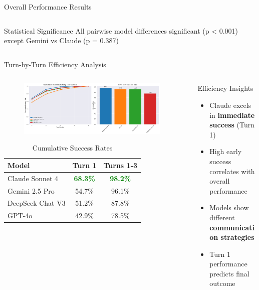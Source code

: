 \documentclass[aspectratio=169]{beamer}
\begin{document}
\begin{frame}{Overall Performance Results}
\begin{columns}
\begin{column}{0.4\textwidth}
\begin{block}{Statistical Significance}
All pairwise model differences significant (p < 0.001) except Gemini vs Claude (p = 0.387)
\end{block}
\end{column}
\end{columns}
\end{frame}

\begin{frame}{Turn-by-Turn Efficiency Analysis}
\begin{columns}
\begin{column}{0.5\textwidth}
\begin{figure}[h]
\centering
\includegraphics[width=0.95\textwidth]{comprehensive_figures/figure2_efficiency.png}
\end{figure}

\vspace{0.5cm}
\begin{table}
\centering
\scriptsize
\begin{tabular}{lcc}
\toprule
\textbf{Model} & \textbf{Turn 1} & \textbf{Turns 1-3} \\
\midrule
Claude Sonnet 4 & \textcolor{green}{\textbf{68.3\%}} & \textcolor{green}{\textbf{98.2\%}} \\
Gemini 2.5 Pro & 54.7\% & 96.1\% \\
DeepSeek Chat V3 & 51.2\% & 87.8\% \\
GPT-4o & 42.9\% & 78.5\% \\
\bottomrule
\end{tabular}
\caption{Cumulative Success Rates}
\end{table}
\end{column}

\begin{column}{0.5\textwidth}
\begin{block}{Efficiency Insights}
\begin{itemize}
    \item Claude excels in \textbf{immediate success} (Turn 1)
    \item High early success correlates with overall performance
    \item Models show different \textbf{communication strategies}
    \item Turn 1 performance predicts final outcome
\end{itemize}
\end{block}


\end{column}
\end{columns}
\end{frame}
\end{document}

